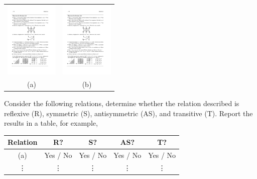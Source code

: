 \begin{questions}
\begin{tabular}{cc}
	\includegraphics[width=1in]{figs/rel1} & 
	\includegraphics[width=1in]{figs/rel3} \\
	(a) \csol{$>$} & (b) \csol{$<$} 
\end{tabular}




 Consider the following relations, determine whether the relation described is reflexive (R), symmetric (S), antisymmetric (AS), and transitive (T).  Report the results in a table, for example, 

\ifprintanswers
\else
\begin{tabular}{|c||c|c|c|c|}
	\hline 
		\textbf{Relation} & \textbf{R?} & \textbf{S?} & \textbf{AS?} & \textbf{T?} \\
	\hline 
		(a)  &  \hspace{0.1in}Yes / No\hspace{0.1in} & \hspace{0.1in}Yes / No\hspace{0.1in} & \hspace{0.1in}Yes / No\hspace{0.1in} &  \hspace{0.1in} Yes / No\hspace{0.1in} \\
		\vdots & \vdots & \vdots & \vdots & \vdots \\	
	\hline 
\end{tabular}


\end{questions}
